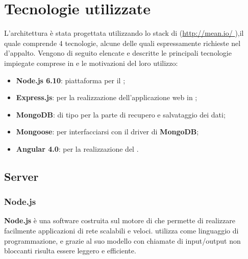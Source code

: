 \section{Tecnologie utilizzate}
L'architettura è stata progettata utilizzando lo stack di \textbf{} (\url {http://mean.io/ } ),il quale comprende 4 tecnologie, alcune delle quali espressamente richieste nel  d’appalto. Vengono di seguito elencate e descritte le principali tecnologie impiegate comprese in \textbf{} e le motivazioni del loro utilizzo:
\begin{itemize}
\item \textbf{Node.js 6.10}: piattaforma per il ;
\item \textbf{Express.js}:  per la realizzazione dell’applicazione web in  ;
\item \textbf{MongoDB}:  di tipo  per la parte di recupero e salvataggio dei dati;
\item \textbf{Mongoose}:  per interfacciarsi con il driver di \textbf{MongoDB};
\item \textbf{Angular 4.0}:   per la realizzazione del  .
\end{itemize}

	\subsection{Server}
	\subsubsection{Node.js}
\textbf{Node.js} è una  software costruita sul motore  di  che permette di realizzare facilmente applicazioni di rete scalabili e veloci.  utilizza  come linguaggio di programmazione, e grazie al suo modello  con chiamate di input/output non bloccanti risulta essere leggero e efficiente.

